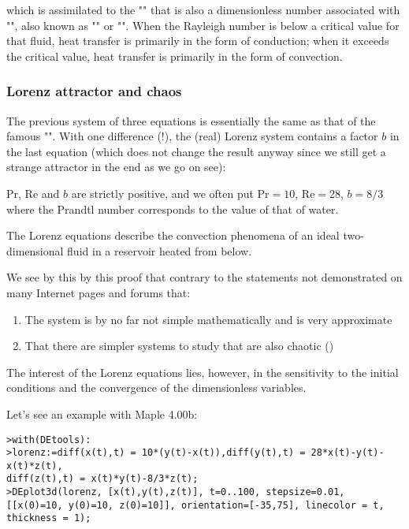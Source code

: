 	which is assimilated to the ""  that is also a dimensionless number associated with "", also known as "" or "". When the Rayleigh number is below a critical value for that fluid, heat transfer is primarily in the form of conduction; when it exceeds the critical value, heat transfer is primarily in the form of convection.
	
	\subsubsection{Lorenz attractor and chaos}
	The previous system of three equations is essentially the same as that of the famous "". With one difference (!), the (real) Lorenz system contains a factor $b$ in the last equation (which does not change the result anyway since we still get a strange attractor in the end as we go on see):
	
	Pr, Re and $b$ are strictly positive, and we often put $\text{Pr}=10$, $\text{Re}=28$, $b=8/3$ where the Prandtl number corresponds to the value of that of water.

	The Lorenz equations describe the convection phenomena of an ideal two-dimensional fluid in a reservoir heated from below.

	We see by this by this proof that contrary to the statements not demonstrated on many Internet pages and forums that:
	\begin{enumerate}
		\item The system is by no far not simple mathematically and is very approximate

		\item That there are simpler systems to study that are also chaotic ()
	\end{enumerate}
	The interest of the Lorenz equations lies, however, in the sensitivity to the initial conditions and the convergence of the dimensionless variables.

	Let's see an example with Maple 4.00b:

	\texttt{>with(DEtools):\\
		>lorenz:=diff(x(t),t) = 10*(y(t)-x(t)),diff(y(t),t) = 28*x(t)-y(t)-x(t)*z(t),\\
		diff(z(t),t) = x(t)*y(t)-8/3*z(t);\\
		>DEplot3d({lorenz}, [x(t),y(t),z(t)], t=0..100, stepsize=0.01, 
		[[x(0)=10, y(0)=10, z(0)=10]], orientation=[-35,75], linecolor = t, thickness = 1);\\
	}
	
